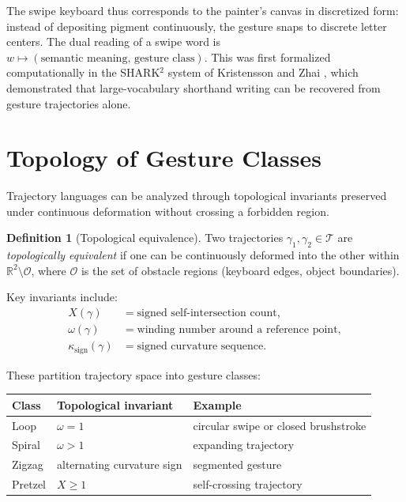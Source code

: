 \documentclass[12pt,a4paper]{article}
\theoremstyle{plain}
\theoremstyle{definition}
\newtheorem{definition}[theorem]{Definition}
\begin{document}
The swipe keyboard thus corresponds to the painter's canvas in discretized form:
instead of depositing pigment continuously, the gesture snaps to discrete letter
centers. The dual reading of a swipe word is
$w\mapsto(\text{semantic meaning},\,\text{gesture class})$.
This was first formalized computationally in the SHARK$^2$ system of Kristensson
and Zhai \cite{kristensson2004}, which demonstrated that large-vocabulary
shorthand writing can be recovered from gesture trajectories alone.

\section{Topology of Gesture Classes}
\label{sec:gesture-topology}

Trajectory languages can be analyzed through topological invariants preserved
under continuous deformation without crossing a forbidden region.

\begin{definition}[Topological equivalence]
Two trajectories $\gamma_1,\gamma_2\in\mathcal{T}$ are
\emph{topologically equivalent} if one can be continuously deformed into the
other within $\mathbb{R}^2\setminus\mathcal{O}$, where $\mathcal{O}$ is the
set of obstacle regions (keyboard edges, object boundaries).
\end{definition}

Key invariants include:
\begin{align*}
X(\gamma) &= \text{signed self-intersection count},\\
\omega(\gamma) &= \text{winding number around a reference point},\\
\kappa_{\text{sign}}(\gamma) &= \text{signed curvature sequence}.
\end{align*}

These partition trajectory space into gesture classes:

\begin{center}
\begin{tabular}{lll}
\toprule
Class & Topological invariant & Example \\
\midrule
Loop    & $\omega=1$        & circular swipe or closed brushstroke \\
Spiral  & $\omega>1$        & expanding trajectory \\
Zigzag  & alternating curvature sign & segmented gesture \\
Pretzel & $X\geq 1$         & self-crossing trajectory \\
\bottomrule
\end{tabular}
\end{center}
\end{document}
